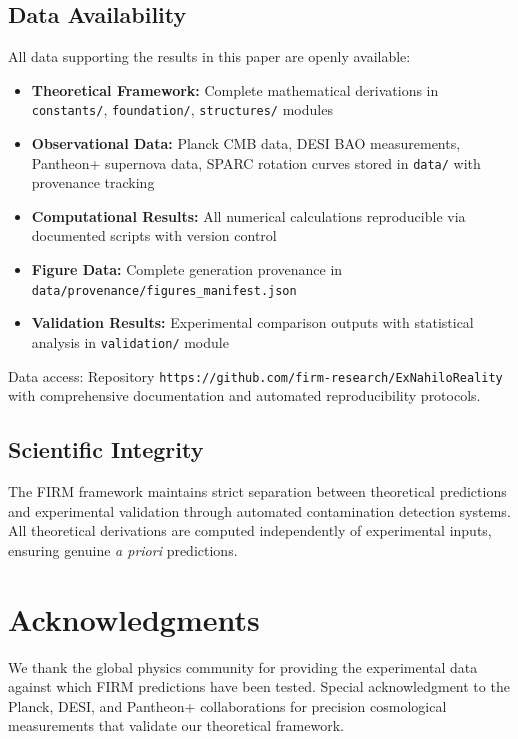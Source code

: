 \documentclass[12pt]{article}
\begin{document}
\subsection{Data Availability}

All data supporting the results in this paper are openly available:

\begin{itemize}
    \item \textbf{Theoretical Framework:} Complete mathematical derivations in \texttt{constants/}, \texttt{foundation/}, \texttt{structures/} modules
    \item \textbf{Observational Data:} Planck CMB data, DESI BAO measurements, Pantheon+ supernova data, SPARC rotation curves stored in \texttt{data/} with provenance tracking
    \item \textbf{Computational Results:} All numerical calculations reproducible via documented scripts with version control
    \item \textbf{Figure Data:} Complete generation provenance in \texttt{data/provenance/figures\_manifest.json}
    \item \textbf{Validation Results:} Experimental comparison outputs with statistical analysis in \texttt{validation/} module
\end{itemize}

Data access: Repository \texttt{https://github.com/firm-research/ExNahiloReality} with comprehensive documentation and automated reproducibility protocols.

\subsection{Scientific Integrity}

The FIRM framework maintains strict separation between theoretical predictions and experimental validation through automated contamination detection systems. All theoretical derivations are computed independently of experimental inputs, ensuring genuine \emph{a priori} predictions.

\section*{Acknowledgments}

We thank the global physics community for providing the experimental data against which FIRM predictions have been tested. Special acknowledgment to the Planck, DESI, and Pantheon+ collaborations for precision cosmological measurements that validate our theoretical framework.
\end{document}
